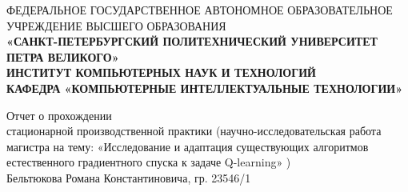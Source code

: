 \documentclass[12pt,a4paper]{extreport}
\begin{document}
	\pagestyle{empty}
	
	\begin{center}
		{\footnotesize
		ФЕДЕРАЛЬНОЕ ГОСУДАРСТВЕННОЕ АВТОНОМНОЕ
		ОБРАЗОВАТЕЛЬНОЕ УЧРЕЖДЕНИЕ ВЫСШЕГО ОБРАЗОВАНИЯ
%
		\\
		\textbf{
			«САНКТ-ПЕТЕРБУРГСКИЙ ПОЛИТЕХНИЧЕСКИЙ УНИВЕРСИТЕТ \\ ПЕТРА ВЕЛИКОГО» \\
			ИНСТИТУТ КОМПЬЮТЕРНЫХ НАУК И ТЕХНОЛОГИЙ \\
			КАФЕДРА «КОМПЬЮТЕРНЫЕ ИНТЕЛЛЕКТУАЛЬНЫЕ ТЕХНОЛОГИИ»
%
		}
		}
	\end{center}
	\vspace{10pt}
	\vspace{\fill}
	\begin{center}
		{\Large
		Отчет о прохождении \\
		стационарной производственной практики
		(научно-исследовательская работа магистра на тему: {\large
			«Исследование и адаптация существующих алгоритмов естественного градиентного спуска к задаче Q-learning»
%
		}) \\
		\vspace{10pt}
		Бельтюкова Романа Константиновича, гр. 23546/1
%
		}
		\vspace{10pt}
	\end{center}
\end{document}

